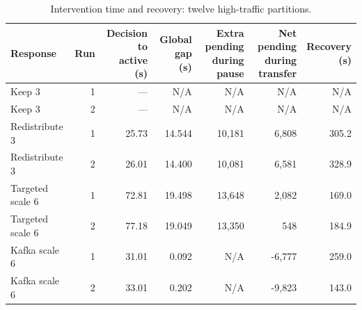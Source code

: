 \begin{table}[!htbp]
\centering\small
\setlength{\tabcolsep}{3pt}
\renewcommand{\arraystretch}{1.12}
\begin{tabular}{@{}lrrrrrr@{}}
\toprule
Response & Run & \shortstack{Decision to\\active (s)} & \shortstack{Global gap\\(s)} & \shortstack{Extra pending\\during pause} & \shortstack{Net pending\\during transfer} & \shortstack{Recovery\\(s)}\\
\midrule
Keep 3 & 1 & --- & N/A & N/A & N/A & N/A\\
Keep 3 & 2 & --- & N/A & N/A & N/A & N/A\\
Redistribute 3 & 1 & 25.73 & 14.544 & 10,181 & 6,808 & 305.2\\
Redistribute 3 & 2 & 26.01 & 14.400 & 10,081 & 6,581 & 328.9\\
Targeted scale 6 & 1 & 72.81 & 19.498 & 13,648 & 2,082 & 169.0\\
Targeted scale 6 & 2 & 77.18 & 19.049 & 13,350 & 548 & 184.9\\
Kafka scale 6 & 1 & 31.01 & 0.092 & N/A & -6,777 & 259.0\\
Kafka scale 6 & 2 & 33.01 & 0.202 & N/A & -9,823 & 143.0\\
\bottomrule
\end{tabular}
\caption{Intervention time and recovery: twelve high-traffic partitions.}
\label{tab:twelve-partition-intervention-cost}
\end{table}

